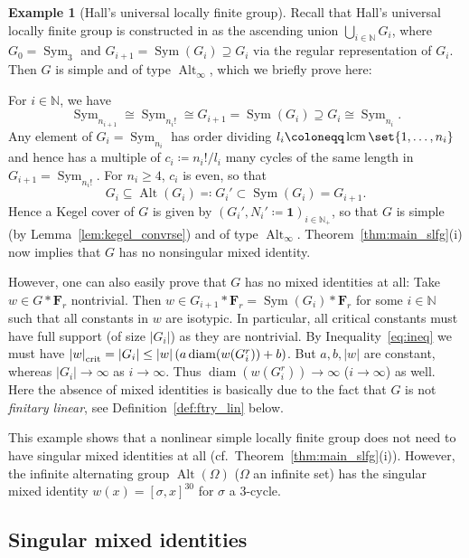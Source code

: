 \documentclass[a4paper,12pt]{amsproc}
\newcommand{\norm}[1]{\left\lvert#1\right\rvert}%
\newcommand{\card}[1]{\left\lvert#1\right\rvert}%
\DeclareMathOperator{\diam}{diam}%
\DeclareMathOperator{\Sym}{Sym}%
\DeclareMathOperator{\Alt}{Alt}%
\DeclareMathOperator{\lcm}{lcm}
\theoremstyle{plain}
\theoremstyle{definition}
\newtheorem{example}[definition]{Example}
\begin{document}
\begin{example}[Hall's universal locally finite group]
Recall that Hall's universal locally finite group is constructed in \cite{hall1959some} as the ascending union $\bigcup_{i\in\mathbb{N}}{G_i}$, where $G_0=\Sym_3$ and $G_{i+1}=\Sym(G_i)\supseteq G_i$ via the regular representation of $G_i$. Then $G$ is simple and of type $\Alt_\infty$, which we briefly prove here:

For $i\in\mathbb{N}$, we have $$\Sym_{n_{i+1}}\cong \Sym_{n_i!}\cong G_{i+1}=\Sym(G_i)\supseteq G_i\cong \Sym_{n_i}.$$ Any element of $G_i=\Sym_{n_i}$ has order dividing $l_i\coloneqq\lcm\set{1,\ldots,n_i}$ and hence has a multiple of $c_i\coloneqq n_i!/l_i$ many cycles of the same length in $G_{i+1}=\Sym_{n_i!}$. For $n_i\geq 4$, $c_i$ is even, so that $$G_i\subseteq\Alt(G_i)\eqqcolon G_i'\subset\Sym(G_i)=G_{i+1}.$$ Hence a Kegel cover of $G$ is given by $(G_i',N_i'\coloneqq\mathbf{1})_{i\in\mathbb{N}_+}$, so that $G$ is simple (by Lemma~\ref{lem:kegel_convrse}) and of type $\Alt_\infty$. Theorem~\ref{thm:main_slfg}(i) now implies that $G$ has no nonsingular mixed identity.

However, one can also easily prove that $G$ has no mixed identities at all: Take $w\in G\ast\mathbf{F}_r$ nontrivial. Then $w\in G_{i+1}\ast\mathbf{F}_r=\Sym(G_i)\ast\mathbf{F}_r$ for some $i\in\mathbb{N}$ such that all constants in $w$ are isotypic. In particular, all critical constants must have full support (of size $\card{G_i}$) as they are nontrivial. By Inequality~\eqref{eq:ineq} we must have $\norm{w}_{\rm crit}=\card{G_i}\leq\norm{w}(a\diam(w(G_i^r))+b)$. But $a,b,\norm{w}$ are constant, whereas $\card{G_i}\to\infty$ as $i\to\infty$. Thus $\diam(w(G_i^r))\to\infty$ ($i\to\infty$) as well. Here the absence of mixed identities is basically due to the fact that $G$ is not \emph{finitary linear}, see Definition~\ref{def:ftry_lin} below.

This example shows that a nonlinear simple locally finite group does  not need to have singular mixed identities at all (cf.\ Theorem~\ref{thm:main_slfg}(i)). However, the infinite alternating group $\Alt(\Omega)$ ($\Omega$ an infinite set) has the singular mixed identity $w(x)=[\sigma,x]^{30}$ for $\sigma$ a $3$-cycle.
\end{example}

\subsection{Singular mixed identities}
\end{document}
